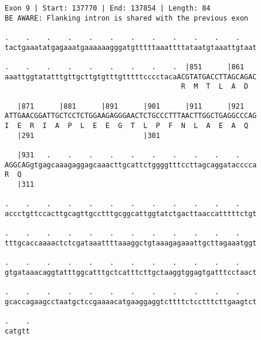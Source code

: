 \documentclass{article}
\begin{document}
\begin{Verbatim}
Exon 9 | Start: 137770 | End: 137854 | Length: 84
BE AWARE: Flanking intron is shared with the previous exon
 
.    .    .    .    .    .    .    .    .    .    .    .    
tactgaaatatgagaaatgaaaaaagggatgtttttaaattttataatgtaaattgtaat
  
.    .    .    .    .    .    .    .    .  |851      |861   
aaattggtatatttgttgcttgtgtttgtttttcccctacaACGTATGACCTTAGCAGAC
                                          R  M  T  L  A  D  
  
   |871      |881      |891      |901      |911      |921   
ATTGAACGGATTGCTCCTCTGGAAGAGGGAACTCTGCCCTTTAACTTGGCTGAGGCCCAG
I  E  R  I  A  P  L  E  E  G  T  L  P  F  N  L  A  E  A  Q  
   |291                          |301                       
  
   |931   .    .    .    .    .    .    .    .    .    .    
AGGCAGgtgagcaaagaggagcaaacttgcattctggggtttccttagcaggatacccca
R  Q                                                        
   |311                                                     
  
.    .    .    .    .    .    .    .    .    .    .    .    
accctgttccacttgcagttgcctttgcggcattggtatctgacttaaccatttttctgt
  
.    .    .    .    .    .    .    .    .    .    .    .    
tttgcaccaaaactctcgataaattttaaaggctgtaaagagaaattgcttagaaatggt
  
.    .    .    .    .    .    .    .    .    .    .    .    
gtgataaacaggtatttggcatttgctcatttcttgctaaggtggagtgatttcctaact
  
.    .    .    .    .    .    .    .    .    .    .    .    
gcaccagaagcctaatgctccgaaaacatgaaggaggtcttttctcctttcttgaagtct
  
.    .
catgtt
\end{Verbatim}
\newpage
\end{document}

